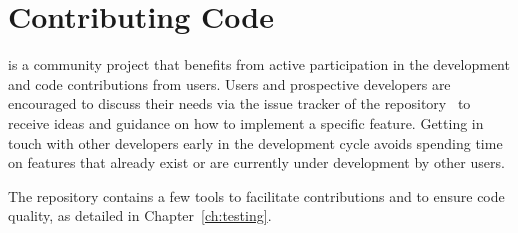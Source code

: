 \section{Contributing Code}
\label{sub:contributing}
\corry is a community project that benefits from active participation in the development and code contributions from users.
Users and prospective developers are encouraged to discuss their needs via the issue tracker of the repository~\cite{corry-issue-tracker} to receive ideas and guidance on how to implement a specific feature.
Getting in touch with other developers early in the development cycle avoids spending time on features that already exist or are currently under development by other users.

The repository contains a few tools to facilitate contributions and to ensure code quality, as detailed in Chapter~\ref{ch:testing}.
